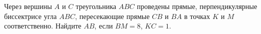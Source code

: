 \begin{ex}
	\begin{condition}
		Через вершины \( A  \) и \( C \) треугольника \( ABC \) проведены прямые, перпендикулярные биссектрисе угла \( ABC \), пересекающие прямые \( CB \) и \( BA \) в точках \( K \) и \( M \) соответственно. Найдите \( AB \), если \( BM = 8 \), \( KC = 1 \).
	\end{condition}
\end{ex}